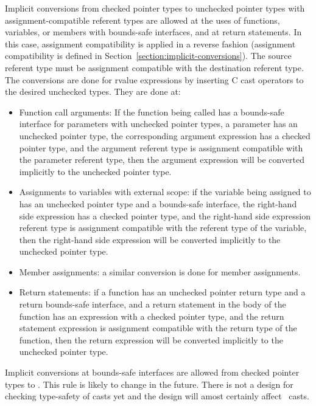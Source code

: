 Implicit conversions from checked pointer types to unchecked pointer types
with assignment-compatible referent types are allowed at the uses of functions,
variables, or members with bounds-safe interfaces, and at return statements.  
In this case, assignment compatibility is applied in a reverse fashion (assignment compatibility
is defined in Section~\ref{section:implicit-conversions}).
The source referent type must be
assignment compatible with the destination referent type.  The conversions are
done for rvalue expressions by inserting C cast operators to the desired unchecked types.
They are done at:
\begin{itemize}
\item Function call arguments: If the function being called has a
      bounds-safe interface for parameters with unchecked pointer types, a parameter
      has an unchecked pointer type, the corresponding argument expression
      has a checked pointer type, and the argument referent type is assignment
      compatible with the parameter referent type, then the argument expression
      will be converted implicitly to the unchecked pointer type.
\item Assignments to variables with external scope: if the variable being
     assigned to has an unchecked pointer type and a bounds-safe interface, the
     right-hand side expression has a checked pointer type, and the right-hand
     side expression referent type is assignment compatible with the referent
     type of the variable, then the right-hand side expression will be converted
     implicitly to the unchecked pointer type.
\item
    Member assignments: a similar conversion is done for member assignments.
\item Return statements: if a function has an unchecked pointer return type and a
  return bounds-safe interface, and a return statement in the body of the function
  has an expression with a checked pointer type, and the return statement expression is
  assignment compatible with the return type of the function, then the return expression
  will be converted implicitly to the unchecked pointer type.
\end{itemize}

Implicit conversions at bounds-safe interfaces are allowed from checked pointer types to
\uncheckedptrvoid.  This rule is likely to change in the future.  There is not a  design for
checking type-safety of casts yet and the design will amost certainly affect 
\uncheckedptrvoid\ casts.

